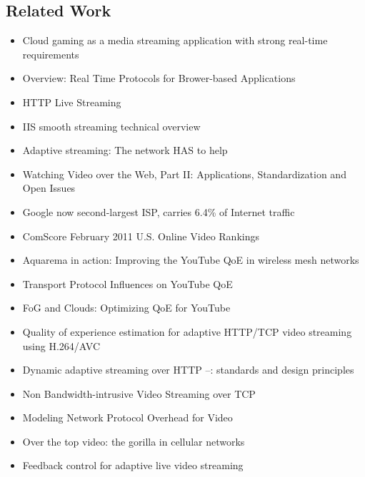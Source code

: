 \subsection{Related Work}

\begin{itemize}
	\item Cloud gaming as a media streaming application with strong real-time requirements \cite{4795441,wang2009modeling,jarschel2011cloudevaluation,ct2010wolken}

	\item Overview: Real Time Protocols for Brower-based Applications\cite{ietf2011rtcwebdraft}
	\item HTTP Live Streaming \cite{pantos2011livestreaming}
	\item IIS smooth streaming technical overview \cite{zambelli_iis_2009}
	\item Adaptive streaming: The network HAS to help \cite{BLTJ:BLTJ20505}
	\item Watching Video over the Web, Part II: Applications, Standardization and Open Issues \cite{watching-video2}
	\item Google now second-largest ISP, carries 6.4\% of Internet traffic \cite{nw2010carrier}
	\item ComScore February 2011 U.S. Online Video Rankings \cite{comscore2011ranking}
	\item Aquarema in action: Improving the YouTube QoE in wireless mesh networks \cite{5733220}
	\item Transport Protocol Influences on YouTube QoE \cite{report2011-258}
	\item FoG and Clouds: Optimizing QoE for YouTube \cite{hossfeld2011fog}
	\item Quality of experience estimation for adaptive HTTP/TCP video streaming using H.264/AVC \cite{6181070}
	\item Dynamic adaptive streaming over HTTP --: standards and design principles \cite{Stockhammer:2011:DAS:1943552.1943572}
	\item Non Bandwidth-intrusive Video Streaming over TCP \cite{5945211}
	\item Modeling Network Protocol Overhead for Video \cite{5703713}
	\item Over the top video: the gorilla in cellular networks \cite{Erman:2011:OTV:2068816.2068829}
	\item Feedback control for adaptive live video streaming \cite{DeCicco:2011:FCA:1943552.1943573}

\end{itemize}
